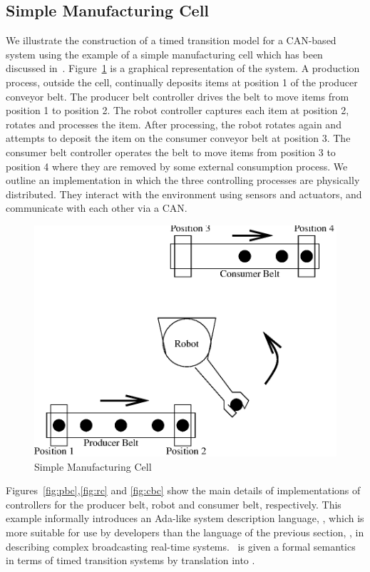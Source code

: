 \subsection{Simple Manufacturing Cell \label{ss:prmpc}}
We illustrate the construction of a timed transition model for a CAN-based
system using the example of a simple manufacturing cell which has been
discussed in~\cite{bjh:96}. Figure~\ref{fig:mpcpic} is a graphical
representation of the system. A production process, outside the cell,
continually deposits items at position 1 of the producer conveyor belt.  The
producer belt controller drives the belt to move items from position 1 to
position 2. The robot controller captures each item at position 2, rotates and
processes the item. After processing, the robot rotates again and attempts to
deposit the item on the consumer conveyor belt at position 3. The consumer
belt controller operates the belt to move items from position 3 to position 4
where they are removed by some external consumption process. We outline an
implementation in which the three controlling processes are physically
distributed. They interact with the environment using sensors and actuators,
and communicate with each other via a CAN.

\begin{figure}
\begin{center}
\includegraphics[width=.5\linewidth]{PRACTICE/prodcell.eps}
\end{center}
\caption{Simple Manufacturing Cell\label{fig:mpcpic}}
\end{figure}
 
Figures~\ref{fig:pbc},\ref{fig:rc} and \ref{fig:cbc} show the main details of
implementations of controllers for the producer belt, robot and consumer belt,
respectively.  This example informally introduces an Ada-like system
description language, \candle, which is more suitable for use by developers than
the language of the previous section, \bcandle, in describing complex broadcasting
real-time systems.  \candle\ is given a formal semantics in terms of timed
transition systems by translation into \bcandle.

